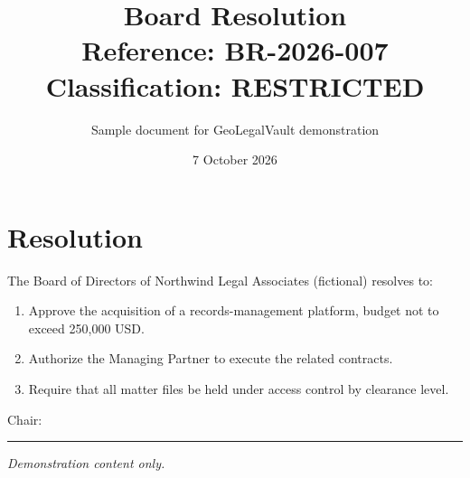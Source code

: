 \documentclass[11pt,a4paper]{article}
\title{\textbf{Board Resolution}\\[2pt]\large Reference: BR-2026-007 \quad Classification: RESTRICTED}
\author{Sample document for GeoLegalVault demonstration}
\date{7 October 2026}
\begin{document}
\maketitle

\section*{Resolution}
The Board of Directors of Northwind Legal Associates (fictional) resolves to:
\begin{enumerate}
  \item Approve the acquisition of a records-management platform, budget not to exceed 250{,}000 USD.
  \item Authorize the Managing Partner to execute the related contracts.
  \item Require that all matter files be held under access control by clearance level.
\end{enumerate}

\vspace{2cm}
\noindent Chair: \rule{5cm}{0.4pt}

\medskip
\small\textit{Demonstration content only.}
\end{document}
